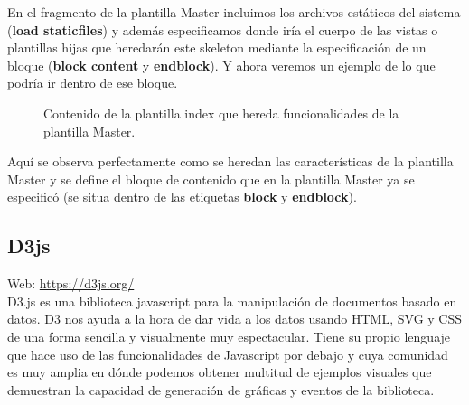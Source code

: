 En el fragmento de la plantilla Master incluimos los archivos estáticos del sistema (\textbf{load staticfiles}) y además especificamos donde iría el cuerpo de las vistas o plantillas hijas que heredarán este skeleton mediante la especificación de un bloque (\textbf{block content} y \textbf{endblock}). Y ahora veremos un ejemplo de lo que podría ir dentro de ese bloque.\\

\newpage
\begin{minipage}{\linewidth}
  \begin{figure}[H]
    
    \caption{Contenido de la plantilla index que hereda funcionalidades de la plantilla Master.}
  \end{figure}
  Aquí se observa perfectamente como se heredan las características de la plantilla Master y se define el bloque de contenido que en la plantilla Master ya se especificó (se situa dentro de las etiquetas \textbf{block} y \textbf{endblock}). \\
\end{minipage}

\subsection{D3js}

Web: \url{https://d3js.org/}\\

D3.js es una biblioteca javascript para la manipulación de documentos basado en datos. D3 nos ayuda a la hora de dar vida a los datos usando HTML, SVG y CSS de una forma sencilla y visualmente muy espectacular. Tiene su propio lenguaje que hace uso de las funcionalidades de Javascript por debajo y cuya comunidad es muy amplia en dónde podemos obtener multitud de ejemplos visuales que demuestran la capacidad de generación de gráficas y eventos de la biblioteca.\\

